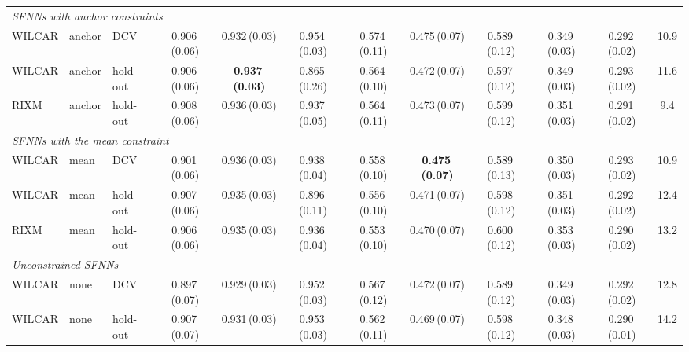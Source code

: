 \begin{table}[!tbp]
{\begin{tabular}{lllccccccccc}
\midrule
\multicolumn{12}{l}{\textit{SFNNs with anchor constraints}} \\
WILCAR & anchor & DCV & 0.906\,{\scriptsize(0.06)} & 0.932\,{\scriptsize(0.03)} & 0.954\,{\scriptsize(0.03)} & 0.574\,{\scriptsize(0.11)} & 0.475\,{\scriptsize(0.07)} & 0.589\,{\scriptsize(0.12)} & 0.349\,{\scriptsize(0.03)} & 0.292\,{\scriptsize(0.02)} & 10.9 \\
WILCAR & anchor & hold-out & 0.906\,{\scriptsize(0.06)} & \textbf{0.937\,{\scriptsize(0.03)}} & 0.865\,{\scriptsize(0.26)} & 0.564\,{\scriptsize(0.10)} & 0.472\,{\scriptsize(0.07)} & 0.597\,{\scriptsize(0.12)} & 0.349\,{\scriptsize(0.03)} & 0.293\,{\scriptsize(0.02)} & 11.6 \\
RIXM & anchor & hold-out & 0.908\,{\scriptsize(0.06)} & 0.936\,{\scriptsize(0.03)} & 0.937\,{\scriptsize(0.05)} & 0.564\,{\scriptsize(0.11)} & 0.473\,{\scriptsize(0.07)} & 0.599\,{\scriptsize(0.12)} & 0.351\,{\scriptsize(0.03)} & 0.291\,{\scriptsize(0.02)} & 9.4 \\
\midrule
\multicolumn{12}{l}{\textit{SFNNs with the mean constraint}} \\
WILCAR & mean & DCV & 0.901\,{\scriptsize(0.06)} & 0.936\,{\scriptsize(0.03)} & 0.938\,{\scriptsize(0.04)} & 0.558\,{\scriptsize(0.10)} & \textbf{0.475\,{\scriptsize(0.07)}} & 0.589\,{\scriptsize(0.13)} & 0.350\,{\scriptsize(0.03)} & 0.293\,{\scriptsize(0.02)} & 10.9 \\
WILCAR & mean & hold-out & 0.907\,{\scriptsize(0.06)} & 0.935\,{\scriptsize(0.03)} & 0.896\,{\scriptsize(0.11)} & 0.556\,{\scriptsize(0.10)} & 0.471\,{\scriptsize(0.07)} & 0.598\,{\scriptsize(0.12)} & 0.351\,{\scriptsize(0.03)} & 0.292\,{\scriptsize(0.02)} & 12.4 \\
RIXM & mean & hold-out & 0.906\,{\scriptsize(0.06)} & 0.935\,{\scriptsize(0.03)} & 0.936\,{\scriptsize(0.04)} & 0.553\,{\scriptsize(0.10)} & 0.470\,{\scriptsize(0.07)} & 0.600\,{\scriptsize(0.12)} & 0.353\,{\scriptsize(0.03)} & 0.290\,{\scriptsize(0.02)} & 13.2 \\
\midrule
\multicolumn{12}{l}{\textit{Unconstrained SFNNs}} \\
WILCAR & none & DCV & 0.897\,{\scriptsize(0.07)} & 0.929\,{\scriptsize(0.03)} & 0.952\,{\scriptsize(0.03)} & 0.567\,{\scriptsize(0.12)} & 0.472\,{\scriptsize(0.07)} & 0.589\,{\scriptsize(0.12)} & 0.349\,{\scriptsize(0.03)} & 0.292\,{\scriptsize(0.02)} & 12.8 \\
WILCAR & none & hold-out & 0.907\,{\scriptsize(0.07)} & 0.931\,{\scriptsize(0.03)} & 0.953\,{\scriptsize(0.03)} & 0.562\,{\scriptsize(0.11)} & 0.469\,{\scriptsize(0.07)} & 0.598\,{\scriptsize(0.12)} & 0.348\,{\scriptsize(0.03)} & 0.290\,{\scriptsize(0.01)} & 14.2 \\

\end{tabular}}
\end{table}
